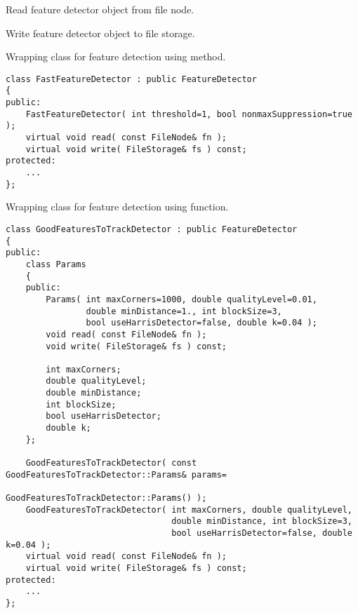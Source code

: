 Read feature detector object from file node.


\begin{description}
\end{description}

Write feature detector object to file storage.


\begin{description}
\end{description}

Wrapping class for feature detection using  method.

\begin{lstlisting}
class FastFeatureDetector : public FeatureDetector
{
public:
    FastFeatureDetector( int threshold=1, bool nonmaxSuppression=true );
    virtual void read( const FileNode& fn );
    virtual void write( FileStorage& fs ) const;
protected:
    ...
};
\end{lstlisting}

Wrapping class for feature detection using  function.

\begin{lstlisting}
class GoodFeaturesToTrackDetector : public FeatureDetector
{
public:
    class Params
    {
    public:
        Params( int maxCorners=1000, double qualityLevel=0.01, 
                double minDistance=1., int blockSize=3, 
                bool useHarrisDetector=false, double k=0.04 );
        void read( const FileNode& fn );
        void write( FileStorage& fs ) const;

        int maxCorners;
        double qualityLevel;
        double minDistance;
        int blockSize;
        bool useHarrisDetector;
        double k;
    };

    GoodFeaturesToTrackDetector( const GoodFeaturesToTrackDetector::Params& params=
                                            GoodFeaturesToTrackDetector::Params() );
    GoodFeaturesToTrackDetector( int maxCorners, double qualityLevel, 
                                 double minDistance, int blockSize=3, 
                                 bool useHarrisDetector=false, double k=0.04 );
    virtual void read( const FileNode& fn );
    virtual void write( FileStorage& fs ) const;
protected:
    ...
};
\end{lstlisting}

